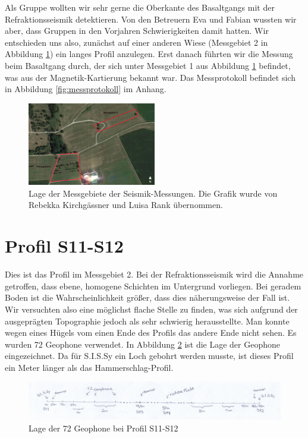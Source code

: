 Als Gruppe wollten wir sehr gerne die Oberkante des Basaltgangs mit der Refraktionsseismik detektieren. Von den Betreuern Eva und Fabian wussten wir aber, dass Gruppen in den Vorjahren Schwierigkeiten damit hatten. Wir entschieden uns also, zunächst auf einer anderen Wiese (Messgebiet 2 in Abbildung \ref{fig:MG}) ein langes Profil anzulegen. Erst danach führten wir die Messung beim Basaltgang durch, der sich unter Messgebiet 1 aus Abbildung \ref{fig:MG} befindet, was aus der Magnetik-Kartierung bekannt war. Das Messprotokoll befindet sich in Abbildung \ref{fig:messprotokoll} im Anhang.

\begin{figure}[!ht]
 \centering
 \includegraphics[width=0.5\textwidth]{fig/Messgebiete}
 \caption[Lage der Messgebiete der Seismik-Messungen]{Lage der Messgebiete der Seismik-Messungen. Die Grafik wurde von Rebekka Kirchgässner und Luisa Rank übernommen.}
 \label{fig:MG}
\end{figure}

\section{Profil S11-S12}

Dies ist das Profil im Messgebiet 2. Bei der Refraktionsseismik wird die Annahme getroffen, dass ebene, homogene Schichten im Untergrund vorliegen. Bei geradem Boden ist die Wahrscheinlichkeit größer, dass dies näherungsweise der Fall ist. Wir versuchten also eine möglichst flache Stelle zu finden, was sich aufgrund der ausgeprägten Topographie jedoch als sehr schwierig herausstellte. Man konnte wegen eines Hügels vom einen Ende des Profils das andere Ende nicht sehen. Es wurden 72 Geophone verwendet. In Abbildung \ref{fig:Lea1} ist die Lage der Geophone eingezeichnet. Da für S.I.S.Sy ein Loch gebohrt werden musste, ist dieses Profil ein Meter länger als das Hammerschlag-Profil.

\begin{figure}[!ht]
 \centering
 \includegraphics[width=\textwidth]{fig/Skizze1}
 \caption{Lage der 72 Geophone bei Profil S11-S12}
 \label{fig:Lea1}
\end{figure}

